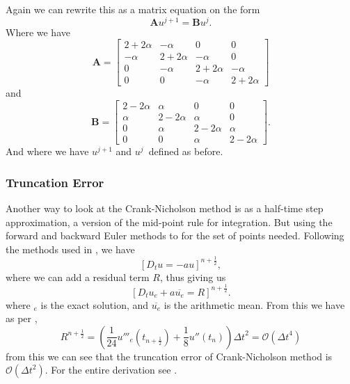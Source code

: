 \documentclass[%
reprint,
nofootinbib,
amsmath,amssymb,
aps,
]{revtex4-1}
\newcommand{\dt}{{\Delta t}}
\begin{document}
Again we can rewrite this as a matrix equation on the form 
\begin{equation}
	\mathbf{A}u^{j+1} = \mathbf{B}u^j.
\end{equation}
Where we have 
\begin{equation}\label{mat CN1}
	\mathbf{A} = \begin{bmatrix}
		2+2\alpha & -\alpha & 0 & 0 \\
		-\alpha & 2+2\alpha & -\alpha & 0 \\
		0 &	-\alpha & 2+2\alpha & -\alpha \\
		0 & 0 &	-\alpha & 2+2\alpha
	\end{bmatrix}
\end{equation}
and 
\begin{equation}\label{mat CN2}
	\mathbf{B} = \begin{bmatrix}
		2-2\alpha & \alpha & 0 & 0 \\
		\alpha & 2-2\alpha & \alpha & 0 \\
		0 &	\alpha & 2-2\alpha & \alpha \\
		0 & 0 &	\alpha & 2-2\alpha
	\end{bmatrix}.
\end{equation}
And where we have $u^{j+1}$ and $u^j$ defined as before. 
\subsubsection{Truncation Error}
Another way to look at the Crank-Nicholson method is as a half-time step approximation, a version of the mid-point rule for integration. But using the forward and backward Euler methods to for the set of points needed. Following the methods used in \cite{Langtangen2015}, we have 
\begin{equation}
	\left[D_t u = -au\right]^{n+\frac{1}{2}},
\end{equation}
where we can add a residual term $R$, thus giving us 
\begin{equation}
	\left[D_t u_e + a\overline{u_e} = R\right]^{n+\frac{1}{2}}.
\end{equation}
where $_e$ is the exact solution, and $\overline{u_e}$ is the arithmetic mean. 
From this we have as per \cite{Langtangen2015}, 
\begin{equation}
	R^{n+\frac{1}{2}} = \left(\frac{1}{24}u'''_e(t_{n+\frac{1}{2}}) + \frac{1}{8}u''(t_n)\right)\dt^2 = \mathcal{O}(\dt^4)
\end{equation}
from this we can see that the truncation error of Crank-Nicholson method is $\mathcal{O}(\dt^2)$. For the entire derivation see \cite{Langtangen2015}.
\end{document}
